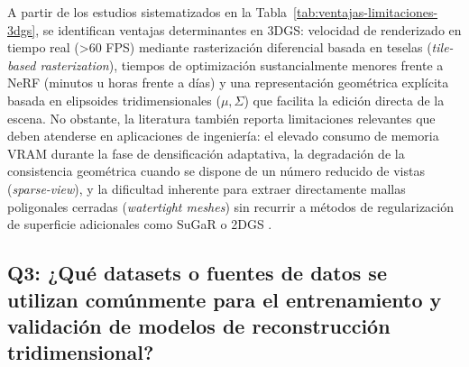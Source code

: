 \documentclass[12pt,oneside]{report}
\begin{document}
A partir de los estudios sistematizados en la Tabla~\ref{tab:ventajas-limitaciones-3dgs}, se identifican ventajas determinantes en 3DGS: velocidad de renderizado en tiempo real (>60 FPS) mediante rasterización diferencial basada en teselas (\textit{tile-based rasterization}), tiempos de optimización sustancialmente menores frente a NeRF (minutos u horas frente a días) y una representación geométrica explícita basada en elipsoides tridimensionales ($\mu, \Sigma$) que facilita la edición directa de la escena. No obstante, la literatura también reporta limitaciones relevantes que deben atenderse en aplicaciones de ingeniería: el elevado consumo de memoria VRAM durante la fase de densificación adaptativa, la degradación de la consistencia geométrica cuando se dispone de un número reducido de vistas (\textit{sparse-view}), y la dificultad inherente para extraer directamente mallas poligonales cerradas (\textit{watertight meshes}) sin recurrir a métodos de regularización de superficie adicionales como SuGaR \citep{guedon2024_sugar} o 2DGS \citep{huang2024_2dgs}.\par

\subsection{Q3: ¿Qué datasets o fuentes de datos se utilizan comúnmente para el entrenamiento y validación de modelos de reconstrucción tridimensional?}
\end{document}
